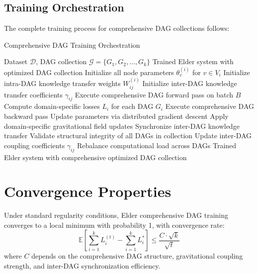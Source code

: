 \subsection{Training Orchestration}

The complete training process for comprehensive DAG collections follows:

\begin{algorithm}[H]
\caption{Comprehensive DAG Training Orchestration}
\begin{algorithmic}[1]
\REQUIRE Dataset $\mathcal{D}$, DAG collection $\mathcal{G} = \{G_1, G_2, \ldots, G_k\}$
\ENSURE Trained Elder system with optimized DAG collection
    \STATE Initialize all node parameters $\theta_v^{(i)}$ for $v \in V_i$
    \STATE Initialize intra-DAG knowledge transfer weights $W_{ij}^{(i)}$
\ENDFOR
\STATE Initialize inter-DAG knowledge transfer coefficients $\gamma_{ij}$
        \STATE Execute comprehensive DAG forward pass on batch $B$
        \STATE Compute domain-specific losses $L_i$ for each DAG $G_i$
        \STATE Execute comprehensive DAG backward pass
        \STATE Update parameters via distributed gradient descent
        \STATE Apply domain-specific gravitational field updates
        \STATE Synchronize inter-DAG knowledge transfer
    \ENDFOR
    \STATE Validate structural integrity of all DAGs in collection
    \STATE Update inter-DAG coupling coefficients $\gamma_{ij}$
    \STATE Rebalance computational load across DAGs
\ENDFOR
\RETURN Trained Elder system with comprehensive optimized DAG collection
\end{algorithmic}
\end{algorithm}

\section{Convergence Properties}

\begin{theorem}
Under standard regularity conditions, Elder comprehensive DAG training converges to a local minimum with probability 1, with convergence rate:
\begin{equation}
\mathbb{E}\left[\sum_{i=1}^k L_i^{(t)} - \sum_{i=1}^k L_i^*\right] \leq \frac{C \cdot \sqrt{k}}{\sqrt{t}}
\end{equation}
where $C$ depends on the comprehensive DAG structure, gravitational coupling strength, and inter-DAG synchronization efficiency.
\end{theorem}

